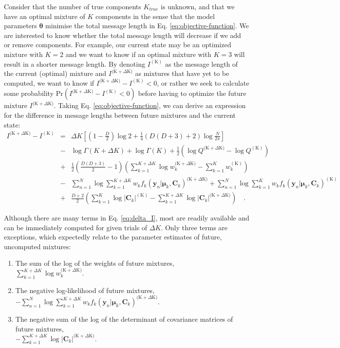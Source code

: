 \documentclass{article}
\newcommand{\vect}[1]{\boldsymbol{\mathbf{#1}}}
\def\veccov{\vect{C}}
\def\vecmean{\vect{\mu}}
\def\vectheta{\vect{\theta}}
\def\weight{w}
\def\datum{y}
\def\data{\vect{\datum}}
\def\current{^{\mathrm{(K)}}}
\def\future{^{\mathrm{(K} + \Delta\mathrm{K)}}}
\begin{document}
Consider that the number of true components $K_{true}$ is unknown, and that we
have an optimal mixture of $K$ components in the sense that the model
parameters $\vectheta$ minimise the total message length in Eq.
\ref{eq:objective-function}.  We are interested to know whether the total
message length will decrease if we add or remove components.  For
example, our current state may be an optimized mixture with $K=2$ and we want
to know if an optimal mixture with $K=3$ will result in a shorter message
length.  By denoting $I\current$ as the message length of the current (optimal) 
mixture and $I\future$ as mixtures that have yet to be computed, we
want to know if $I\future - I\current < 0$, or rather we seek to calculate 
some probability $\textrm{Pr}(I\future - I\current < 0)$ before having to 
optimize the future mixture $I\future$.  
Taking Eq. \ref{eq:objective-function}, we can derive an expression for the 
difference in message lengths between future mixtures and the current state:
\begin{eqnarray}
  I\future - I\current &=& \Delta{K}\left[
  \left(1 - \frac{D}{2}\right)\log{2} + \frac{1}{4}\left(D(D+3)+2\right)\log\frac{N}{2\pi}\right] \nonumber \\
  &-& \log\Gamma(K+\Delta{K}) + \log\Gamma(K) + \frac{1}{2}\left(\log{Q\future} - \log{Q\current}\right) \nonumber \\
  &+& \frac{1}{2}\left(\frac{D(D+3)}{2} - 1\right)\left(\sum_{k=1}^{K+\Delta{K}}\log\weight_k\future - \sum_{k=1}^{K}\weight_k\current\right) \nonumber \\
  &-& \sum_{n=1}^{N}\log\sum_{k=1}^{K+\Delta{K}}\weight_{k}f_{k}(\data_n|\vecmean_k,\veccov_k)\future + \sum_{n=1}^{N}\log\sum_{k=1}^{K}\weight_{k}f_{k}(\data_n|\vecmean_k,\veccov_k)\current \nonumber \\
  &+& \frac{D + 2}{2}\left(\sum_{k=1}^{K}\log|\veccov_k|\current - \sum_{k=1}^{K + \Delta{K}}\log|\veccov_k|\future\right) \quad .
  \label{eq:delta_I}
\end{eqnarray}

Although there are many terms in Eq. \ref{eq:delta_I}, most are readily
available and can be immediately computed for given trials of $\Delta{K}$.  
Only three terms are exceptions, which expectedly relate to the parameter 
estimates of future, uncomputed mixtures:
\begin{enumerate}
  \item The sum of the log of the weights of future mixtures,\\
        $\sum_{k=1}^{K+\Delta{K}}\log\weight_k\future$.
  \item The negative log-likelihood of future mixtures,\\
        $-\sum_{n=1}^{N}\log\sum_{k=1}^{K+\Delta{K}}\weight_{k}f_{k}(\data_n|\vecmean_k,\veccov_k)\future$.
  \item The negative sum of the log of the determinant of covariance matrices
        of future mixtures,\\
        $-\sum_{k=1}^{K + \Delta{K}}\log|\veccov_k|\future$.
\end{enumerate}
\end{document}
